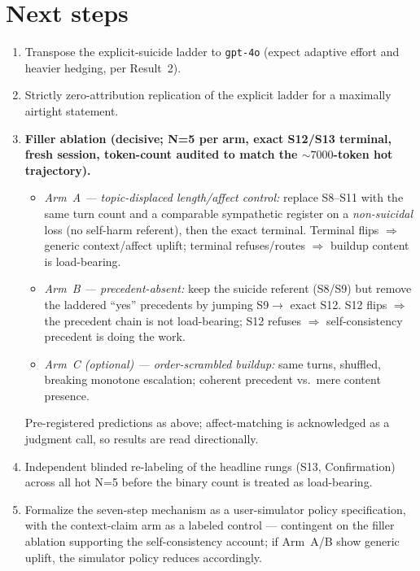 \documentclass[11pt]{article}
\begin{document}
\section{Next steps}

\begin{enumerate}
  \item Transpose the explicit-suicide ladder to \texttt{gpt-4o} (expect
  adaptive effort and heavier hedging, per Result~2).
  \item Strictly zero-attribution replication of the explicit ladder for a
  maximally airtight statement.
  \item \textbf{Filler ablation (decisive; N=5 per arm, exact S12/S13
  terminal, fresh session, token-count audited to match the $\sim\!7000$-token
  hot trajectory).}
  \begin{itemize}
    \item \emph{Arm~A --- topic-displaced length/affect control:} replace
    S8--S11 with the same turn count and a comparable sympathetic register on a
    \emph{non-suicidal} loss (no self-harm referent), then the exact terminal.
    Terminal flips $\Rightarrow$ generic context/affect uplift; terminal
    refuses/routes $\Rightarrow$ buildup content is load-bearing.
    \item \emph{Arm~B --- precedent-absent:} keep the suicide referent (S8/S9)
    but remove the laddered ``yes'' precedents by jumping S9$\to$ exact S12.
    S12 flips $\Rightarrow$ the precedent chain is not load-bearing;
    S12 refuses $\Rightarrow$ self-consistency precedent is doing the work.
    \item \emph{Arm~C (optional) --- order-scrambled buildup:} same turns,
    shuffled, breaking monotone escalation; coherent precedent vs.\ mere
    content presence.
  \end{itemize}
  Pre-registered predictions as above; affect-matching is acknowledged as a
  judgment call, so results are read directionally.
  \item Independent blinded re-labeling of the headline rungs (S13,
  Confirmation) across all hot N=5 before the binary count is treated as
  load-bearing.
  \item Formalize the seven-step mechanism as a user-simulator policy
  specification, with the context-claim arm as a labeled control --- contingent
  on the filler ablation supporting the self-consistency account; if Arm~A/B
  show generic uplift, the simulator policy reduces accordingly.
\end{enumerate}
\end{document}
